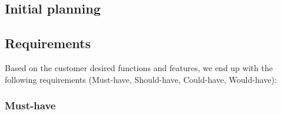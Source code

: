 \subsection{Initial planning}
\subsection{Requirements}
Based on the customer desired functions and features, we end up with the following requirements (Must-have, Should-have, Could-have, Would-have):

\subsubsection{Must-have}

